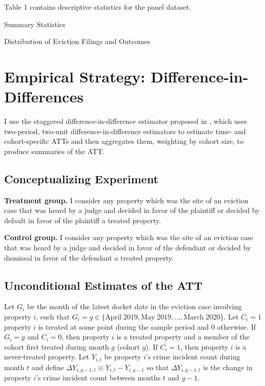 \documentclass[12pt]{article}
\begin{document}
    Table 1 contains descriptive statistics for the panel dataset. 
    
    



         \begin{table}[H]
            \centering
            \small
            
            \caption{Summary Statistics}
            \label{tab:table_1}
        \end{table}


       \begin{table}[H]
            \centering
            \small
            
            \caption{Distribution of Eviction Filings and Outcomes}
            \label{tab:my_label}
        \end{table}


\section{Empirical Strategy: Difference-in-Differences}
I use the staggered difference-in-difference estimator proposed in \cite{callaway_difference--differences_2021}, which uses two-period, two-unit difference-in-difference estimators to estimate time- and cohort-specific ATTs and then aggregates them, weighting by cohort size, to produce summaries of the ATT. 
    \subsection{Conceptualizing Experiment}
    \textbf{Treatment group.} I consider any property which was the site of an eviction case that was heard by a judge and decided in favor of the plaintiff or decided by default in favor of the plaintiff a treated property.
    
    \textbf{Control group.} I consider any property which was the site of an eviction case that was heard by a judge and decided in favor of the defendant or decided by dismissal in favor of the defendant a treated property.
    
    
    
       \subsection{Unconditional Estimates of the ATT}
    
    Let $G_i$ be the month of the latest docket date in the eviction case involving property $i$, such that $G_i = g \in \{\text{April} \; 2019, \text{May} \; 2019, ..., \text{March} \; 2020\}$. Let $C_i = 1$ property $i$ is treated at some point during the sample period and $0$ otherwise. If $G_i = g$ and $C_i = 0$, then property $i$ is a treated property and a member of the cohort first treated during month $g$ (cohort $g$). If $C_i=1$, then property $i$ is a never-treated property. Let $Y_{i,t}$ be property $i$'s crime incident count during month $t$ and define $\Delta Y_{i, g-1, t} \equiv Y_{i,t} - Y_{i,g-1}$ so that $\Delta Y_{i, g-1, t}$ is the change in property $i$'s crime incident count between months $t$ and $g-1$.
\end{document}
